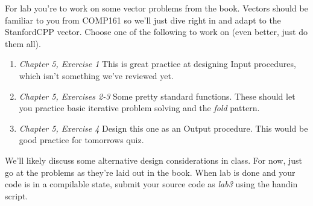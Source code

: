 \documentclass[10pt]{article}
\begin{document}
For lab you're to work on some vector problems from the book. Vectors should be familiar to you from COMP161 so we'll just dive right in and adapt to the StanfordCPP vector. Choose one of the following to work on (even better, just do them all). 
\begin{enumerate}
\item \textit{Chapter 5, Exercise 1} This is great practice at designing Input procedures, which isn't something we've reviewed yet. 
\item \textit{Chapter 5, Exercises 2-3} Some pretty standard functions. These should let you practice basic iterative problem solving and the \textit{fold} pattern.
\item \textit{Chapter 5, Exercise 4} Design this one as an Output procedure. This would be good practice for tomorrows quiz.
\end{enumerate}
We'll likely discuss some alternative design considerations in class. For now, just go at the problems as they're laid out in the book. When lab is done and your code is in a compilable state, submit your source code as \textit{lab3} using the handin script.
\end{document}
